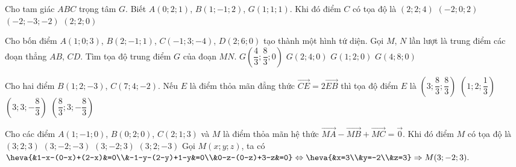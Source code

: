 \begin{ex}
	Cho tam giác $ABC$ trọng tâm $G$. Biết $A(0;2;1)$, $B(1;-1;2)$, $G(1;1;1)$. Khi đó điểm $C$ có tọa độ là
	\choice
	{$(2;2;4)$}
	{$(-2;0;2)$}
	{$(-2;-3;-2)$}
	{\True $(2;2;0)$}
\end{ex} 

\begin{ex}
	Cho bốn điểm $A(1;0;3)$, $B(2;-1;1)$, $C(-1;3;-4)$, $D(2;6;0)$ tạo thành một hình tứ diện. Gọi $M$, $N$ lần lượt là trung điểm các đoạn thẳng $AB$, $CD$. Tìm tọa độ trung điểm $G$ của đoạn $MN$.
	\choice
	{$G\left(\dfrac{4}{3};\dfrac{8}{3};0\right)$}
	{$G(2;4;0)$}
	{\True $G(1;2;0)$}
	{$G(4;8;0)$}
\end{ex} 


\begin{ex}
	Cho hai điểm $B(1;2;-3)$, $C(7;4;-2)$. Nếu $E$ là điểm thỏa mãn đẳng thức $\vec{CE}=2\vec{EB}$ thì tọa độ điểm $E$ là
	\choice
	{$\left(3;\dfrac{8}{3};\dfrac{8}{3}\right)$}
	{$\left(1;2;\dfrac{1}{3}\right)$}
	{$\left(3;3;-\dfrac{8}{3}\right)$}
	{\True $\left(\dfrac{8}{3};3;-\dfrac{8}{3}\right)$}
\end{ex} 

\begin{ex}
	Cho các điểm $A(1;-1;0)$, $B(0;2;0)$, $C(2;1;3)$ và $M$ là điểm thỏa mãn hệ thức $\vec{MA}-\vec{MB}+\vec{MC}=\vec{0}$. Khi đó điểm $M$ có tọa độ là
	\choice
	{$(3;2;3)$}
	{$(3;-2;-3)$}
	{\True$(3;-2;3)$}
	{$(3;2;-3)$}
	\loigiai
	{
		Gọi $M(x;y;z)$, ta có $\heva{&1-x-(0-x)+(2-x)&=0\\&-1-y-(2-y)+1-y&=0\\&0-z-(0-z)+3-z&=0}\Leftrightarrow \heva{&x=3\\&y=-2\\&z=3}\Rightarrow M(3;-2;3).$
	}
\end{ex} 

